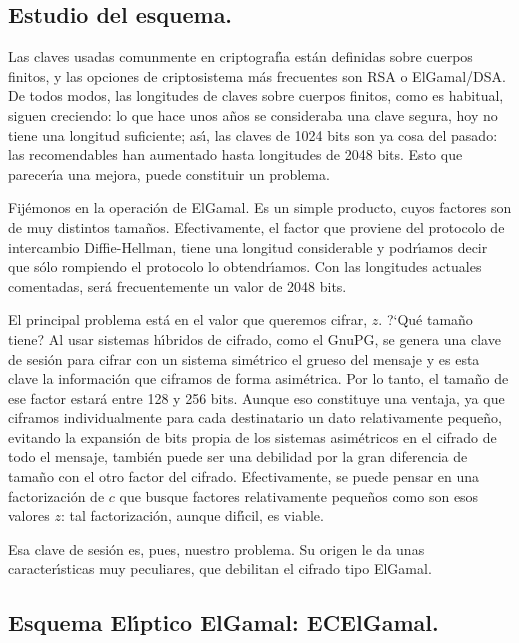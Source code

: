 \documentclass{llncs}
\theoremstyle{plain}        			%
\theoremstyle{definition}   			%
\theoremstyle{saltolinea}   			%
\begin{document}
\subsection*{Estudio del esquema.}

Las claves usadas comunmente en criptograf\'{\i}a est\'an definidas sobre cuerpos finitos, y las opciones de criptosistema m\'as frecuentes son RSA o ElGamal/DSA. De todos modos, las longitudes de claves sobre cuerpos finitos, como es habitual, siguen creciendo: lo que hace unos a\~nos se consideraba una clave segura, hoy no tiene una longitud suficiente; as\'{\i}, las claves de 1024 bits son ya cosa del pasado: las recomendables han aumentado hasta longitudes de 2048 bits. Esto que parecer\'{\i}a una mejora, puede constituir un problema.

Fij\'emonos en la operaci\'on de ElGamal. Es un simple producto, cuyos factores son de muy distintos tama\~nos. Efectivamente, el factor que proviene del protocolo de intercambio Diffie-Hellman, tiene una longitud considerable y podr\'{\i}amos decir que s\'olo rompiendo el protocolo lo obtendr\'{\i}amos. Con las longitudes actuales comentadas, ser\'a frecuentemente un valor de 2048 bits.

El principal problema est\'a en el valor que queremos cifrar, $z$. ?`Qu\'e tama\~no tiene? Al usar sistemas h\'{\i}bridos de cifrado, como el GnuPG, se genera una clave de sesi\'on para cifrar con un sistema sim\'etrico el grueso del mensaje y es esta clave la informaci\'on que ciframos de forma asim\'etrica. Por lo tanto, el tama\~no de ese factor estar\'a entre 128 y 256 bits. Aunque eso constituye una ventaja, ya que ciframos individualmente para cada destinatario un dato relativamente peque\~no, evitando la expansi\'on de bits propia de los sistemas asim\'etricos en el cifrado de todo el mensaje, tambi\'en puede ser una debilidad por la gran diferencia de tama\~no con el otro factor del cifrado. Efectivamente, se puede pensar en una factorizaci\'on de $c$ que busque factores relativamente peque\~nos como son esos valores $z$: tal factorizaci\'on, aunque dif\'{\i}cil, es viable.

Esa clave de sesi\'on es, pues, nuestro problema. Su origen le da unas caracter\'{\i}sticas muy peculiares, que debilitan el cifrado tipo ElGamal.

\subsection{Esquema El\'{\i}ptico ElGamal: ECElGamal.}
\end{document}
